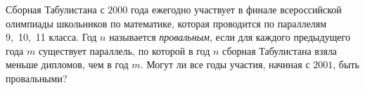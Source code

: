 \begin{problems}
\item Сборная Табулистана с $2000$ года ежегодно участвует в финале всероссийской олимпиады школьников по математике, которая проводится по параллелям 9,~10,~11 класса. Год $n$ называется \emph{провальным}, если для каждого предыдущего года $m$ существует параллель, по которой в год $n$ сборная Табулистана взяла меньше дипломов, чем в год $m$. Могут ли все годы участия, начиная с $2001$, быть провальными?








\end{problems}

